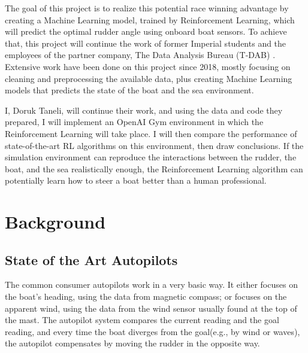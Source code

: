 \documentclass[12pt,twoside]{report}
\begin{document}
The goal of this project is to realize this potential race winning advantage by creating a Machine Learning model, trained by Reinforcement Learning, which will predict the optimal rudder angle using onboard boat sensors. To achieve that, this project will continue the work of former Imperial students and the employees of the partner company, The Data Analysis Bureau (T-DAB) \cite{t-dab}. Extensive work have been done on this project since 2018, mostly focusing on cleaning and preprocessing the available data, plus creating Machine Learning models that predicts the state of the boat and the sea environment.

I, Doruk Taneli, will continue their work, and using the data and code they prepared, I will implement an OpenAI Gym environment in which the Reinforcement Learning will take place. I will then compare the performance of state-of-the-art RL algorithms on this environment, then draw conclusions. If the simulation environment can reproduce the interactions between the rudder, the boat, and the sea realistically enough, the Reinforcement Learning algorithm can potentially learn how to steer a boat better than a human professional.




\chapter{Background}

\section{State of the Art Autopilots}

The common consumer autopilots work in a very basic way. It either focuses on the boat's heading, using the data from magnetic compass; or focuses on the apparent wind, using the data from the wind sensor usually found at the top of the mast. The autopilot system compares the current reading and the goal reading, and every time the boat diverges from the goal(e.g., by wind or waves), the autopilot compensates by moving the rudder in the opposite way. 
\end{document}
